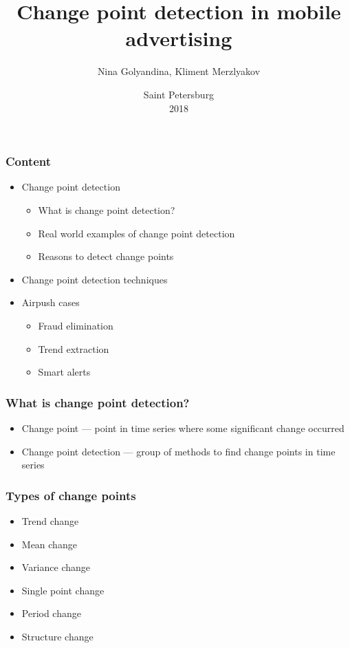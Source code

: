 \documentclass[intlimits, 9pt, unicode]{beamer}
\title{Change point detection in mobile advertising}
\author{Nina Golyandina, Kliment Merzlyakov}
\institute{Saint Petersburg State University \\
    Mathematical faculty \\
     Applied statistics department \\
}
\date{
    Saint Petersburg\\
    2018
}
\begin{document}
\begin{frame}
    \titlepage
\end{frame}

\begin{frame}
    \frametitle{Content}

    \begin{itemize}
    	\item Change point detection
		     	 \begin{itemize}
	    		   \item What is change point detection?
		    	   \item Real world examples of change point detection 
		    	   \item Reasons to detect change points
		    	  \end{itemize}
        \item Change point detection techniques
        \item Airpush cases
		     	 \begin{itemize}
	    		   \item Fraud elimination
		    	   \item Trend extraction
		    	   \item Smart alerts
		    	  \end{itemize}
    \end{itemize}
\end{frame}


\begin{frame}
    \frametitle{What is change point detection?}

    \begin{itemize}
    	\item Change point --- point in time series where some significant change occurred
	\item Change point detection --- group of methods to find change points in time series
    \end{itemize}
\end{frame}

\begin{frame}
    \frametitle{Types of change points}

    \begin{itemize}
    	\item Trend change
	\item Mean change
	\item Variance change
	\item Single point change
	\item Period change
	\item Structure change
    \end{itemize}
\end{frame}
\end{document}
